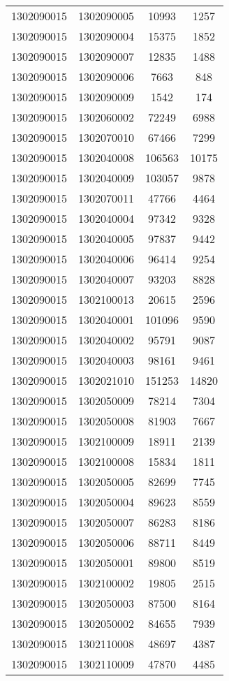 \begin{longtable}{llcc}
1302090015 & 1302090005 & 10993 & 1257\\
1302090015 & 1302090004 & 15375 & 1852\\
1302090015 & 1302090007 & 12835 & 1488\\
1302090015 & 1302090006 & 7663 & 848\\
1302090015 & 1302090009 & 1542 & 174\\
1302090015 & 1302060002 & 72249 & 6988\\
1302090015 & 1302070010 & 67466 & 7299\\
1302090015 & 1302040008 & 106563 & 10175\\
1302090015 & 1302040009 & 103057 & 9878\\
1302090015 & 1302070011 & 47766 & 4464\\
1302090015 & 1302040004 & 97342 & 9328\\
1302090015 & 1302040005 & 97837 & 9442\\
1302090015 & 1302040006 & 96414 & 9254\\
1302090015 & 1302040007 & 93203 & 8828\\
1302090015 & 1302100013 & 20615 & 2596\\
1302090015 & 1302040001 & 101096 & 9590\\
1302090015 & 1302040002 & 95791 & 9087\\
1302090015 & 1302040003 & 98161 & 9461\\
1302090015 & 1302021010 & 151253 & 14820\\
1302090015 & 1302050009 & 78214 & 7304\\
1302090015 & 1302050008 & 81903 & 7667\\
1302090015 & 1302100009 & 18911 & 2139\\
1302090015 & 1302100008 & 15834 & 1811\\
1302090015 & 1302050005 & 82699 & 7745\\
1302090015 & 1302050004 & 89623 & 8559\\
1302090015 & 1302050007 & 86283 & 8186\\
1302090015 & 1302050006 & 88711 & 8449\\
1302090015 & 1302050001 & 89800 & 8519\\
1302090015 & 1302100002 & 19805 & 2515\\
1302090015 & 1302050003 & 87500 & 8164\\
1302090015 & 1302050002 & 84655 & 7939\\
1302090015 & 1302110008 & 48697 & 4387\\
1302090015 & 1302110009 & 47870 & 4485\\

\end{longtable}
